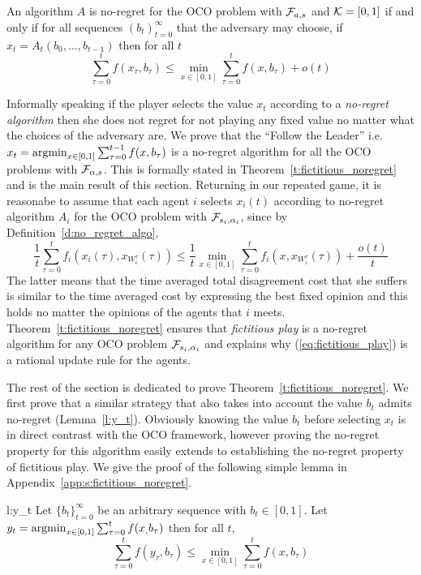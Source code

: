 \begin{definition}\label{d:no_regret_algo}
An algorithm $A$ is no-regret for the OCO problem with $\mathcal{F}_{a,s}$ and
$\mathcal{K}=[0,1]$ if and only if for all sequences $(b_t)_{t=0}^\infty$ that the
adversary may choose, if $x_t = A_t(b_0,\dots,b_{t-1})$ then for all $t$
\[\sum_{\tau=0}^t f(x_\tau,b_\tau)  \leq \min_{x \in [0,1]}\sum_{\tau=0}^t f(x,b_\tau) + o(t) \]
\end{definition}
Informally speaking if the player selects the value
$x_t$ according to a \emph{no-regret algorithm} then
she does not regret for not playing any fixed value no
matter what the choices of the adversary are.
We prove that the \enquote{Follow the Leader} i.e.
$x_t = \operatorname*{argmin}_{x \in [0,1]}\sum_{\tau=0}^{t-1}f(x,b_\tau)$
is a no-regret algorithm for all the OCO problems with $\mathcal{F}_{\alpha,s}$.
This is formally stated in Theorem~\ref{t:fictitious_noregret}
and is the main result of this section.
Returning in our repeated game, it is reasonabe to
assume that each agent $i$ selects $x_i(t)$ according
to no-regret algorithm $A_i$ for the OCO problem with $\mathcal{F}_{s_i,\alpha_i}$,
since by Definition~\ref{d:no_regret_algo},
\[\frac{1}{t}\sum_{\tau=0}^t f_i(x_i(\tau),x_{W_i^\tau}(\tau)) \leq
\frac{1}{t}\min_{x \in [0,1]}\sum_{\tau=0}^tf_i(x,x_{W_i^\tau}(\tau)) + \frac{o(t)}{t}\]
The latter means that the time averaged total disagreement cost
that she suffers is similar to the time averaged cost by expressing the
best fixed opinion and this holds no matter the opinions of the
agents that $i$ meets. Theorem~\ref{t:fictitious_noregret}
ensures that \emph{fictitious play} is a no-regret algorithm
for any OCO problem $\mathcal{F}_{s_i,\alpha_i}$ and explains why
(\ref{eq:fictitious_play}) is a rational update rule for the agents.

The rest of the section is dedicated to prove Theorem~\ref{t:fictitious_noregret}.
We first prove that a similar strategy that also takes into
account the value $b_t$ admits no-regret (Lemma~\ref{l:y_t}).
Obviously knowing the value $b_t$ before selecting $x_t$
is in direct contrast with the OCO framework, however proving
the no-regret property for this algorithm easily extends to
establishing the no-regret property of fictitious play.
We give the proof of the following simple lemma in
Appendix~\ref{app:s:fictitious_noregret}.

\begin{replemma}{l:y_t}
Let $\{b_t\}_{t=0}^\infty$ be an arbitrary sequence with $b_t \in [0,1]$. Let $y_t = \operatorname*{argmin}_{x \in [0,1]}\sum_{\tau=0}^tf(x_,b_\tau)$
then for all $t$,
\[
\sum_{\tau=0}^t f(y_\tau,b_\tau) \leq \min_{x \in [0,1]}\sum_{\tau = 0}^tf(x,b_\tau)
\]
\end{replemma}

